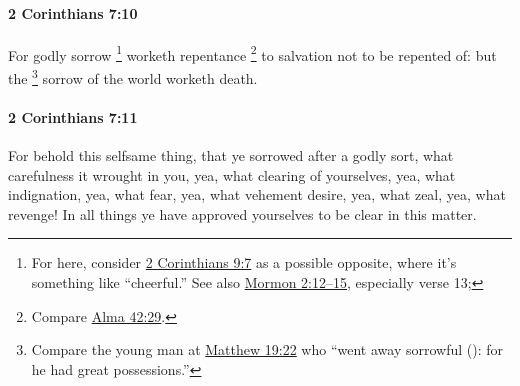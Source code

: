		\paragraph{2 Corinthians 7:10} %
			\label{2CORINTHIANS-7-10}

			For godly sorrow%
				\footnote{%
					For  here, consider \hyperref[2CORINTHIANS-9-7]{2 Corinthians 9:7} as a possible opposite, where it's something like ``cheerful.'' See also \hyperref[MORMON-2-12]{Mormon 2:12--15}, especially verse 13; 
					}
			worketh repentance%
			\footnote{%
				Compare \hyperref[ALMA-42-29]{Alma 42:29}.
				}
			to salvation not to be repented of: but the 
				\footnote{%
					Compare the young man at \hyperref[MATTHEW-19-22]{Matthew 19:22} who ``went away sorrowful (): for he had great possessions.''
					}%
			sorrow of the world worketh death.

			\begin{framed}
			\scriptsize
				\begin{compactdesc}
					\item[SBLG] 
				\end{compactdesc}
			\end{framed}

		\paragraph{2 Corinthians 7:11} %
			\label{2CORINTHIANS-7-11}

			For behold this selfsame thing, that ye sorrowed after a godly sort, what carefulness it wrought in you, yea, what clearing of yourselves, yea, what indignation, yea, what fear, yea, what vehement desire, yea, what zeal, yea, what revenge!  In all things ye have approved yourselves to be clear in this matter.

